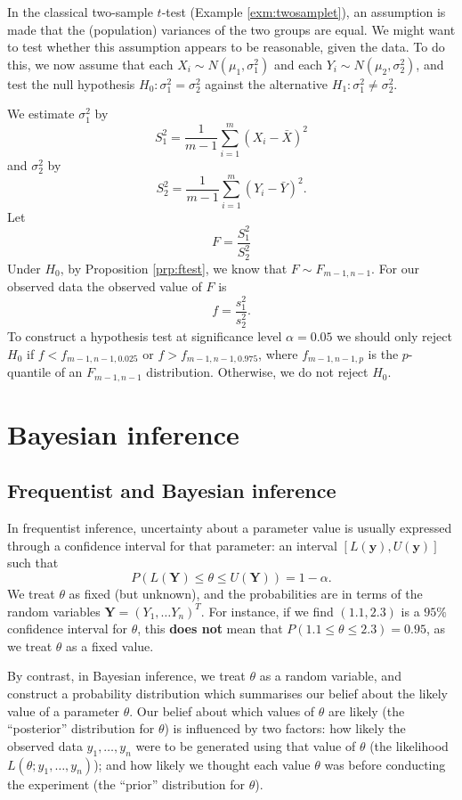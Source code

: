 \documentclass[]{book}
\theoremstyle{definition}
\theoremstyle{definition}
\theoremstyle{definition}
\theoremstyle{remark}
\let\BeginKnitrBlock\begin \let\EndKnitrBlock\end
\begin{document}
\BeginKnitrBlock{example}[$F$-test for equality of variances]
\protect\hypertarget{exm:unnamed-chunk-109}{}{\label{exm:unnamed-chunk-109}
\iffalse (\(F\)-test for equality of variances) \fi{} }In the classical
two-sample \(t\)-test (Example \ref{exm:twosamplet}), an assumption is
made that the (population) variances of the two groups are equal. We
might want to test whether this assumption appears to be reasonable,
given the data. To do this, we now assume that each
\(X_i \sim N(\mu_1, \sigma_1^2)\) and each
\(Y_i \sim N(\mu_2, \sigma_2^2)\), and test the null hypothesis
\(H_0: \sigma_1^2 = \sigma_2^2\) against the alternative
\(H_1: \sigma_1^2 \not = \sigma_2^2\).

We estimate \(\sigma_1^2\) by
\[S_1^2 = \frac{1}{m - 1} \sum_{i=1}^{m} (X_i - \bar X)^2\] and
\(\sigma_2^2\) by
\[S_2^2 = \frac{1}{m - 1} \sum_{i=1}^{m} (Y_i - \bar Y)^2.\] Let
\[F = \frac{S_1^2}{S_2^2}\] Under \(H_0\), by Proposition
\ref{prp:ftest}, we know that \(F \sim F_{m-1, n-1}.\) For our observed
data the observed value of \(F\) is \[f = \frac{s_1^2}{s_2^2}.\] To
construct a hypothesis test at significance level \(\alpha = 0.05\) we
should only reject \(H_0\) if \(f < f_{m-1, n-1, 0.025}\) or
\(f > f_{m-1, n-1, 0.975}\), where \(f_{m-1, n-1, p}\) is the
\(p\)-quantile of an \(F_{m-1, n-1}\) distribution. Otherwise, we do not
reject \(H_0\).
\EndKnitrBlock{example}

\chapter{Bayesian inference}\label{bayesian}

\section{Frequentist and Bayesian
inference}\label{frequentist-and-bayesian-inference}

In frequentist inference, uncertainty about a parameter value is usually
expressed through a confidence interval for that parameter: an interval
\([L(\bm y), U(\bm y)]\) such that
\[P(L(\bm Y) \leq \theta \leq U(\bm Y)) = 1- \alpha.\] We treat
\(\theta\) as fixed (but unknown), and the probabilities are in terms of
the random variables \(\bm Y = (Y_1, \ldots Y_n)^T\). For instance, if
we find \((1.1, 2.3)\) is a \(95 \%\) confidence interval for
\(\theta\), this \textbf{does not} mean that
\(P(1.1 \leq \theta \leq 2.3) = 0.95\), as we treat \(\theta\) as a
fixed value.

By contrast, in Bayesian inference, we treat \(\theta\) as a random
variable, and construct a probability distribution which summarises our
belief about the likely value of a parameter \(\theta\). Our belief
about which values of \(\theta\) are likely (the ``posterior''
distribution for \(\theta\)) is influenced by two factors: how likely
the observed data \(y_1, \ldots, y_n\) were to be generated using that
value of \(\theta\) (the likelihood \(L(\theta; y_1, \ldots, y_n)\));
and how likely we thought each value \(\theta\) was before conducting
the experiment (the ``prior'' distribution for \(\theta\)).
\end{document}
